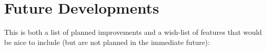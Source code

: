 \documentclass[12pt]{article}
\newcommand{\ie}{i.e.\ }
\newcommand{\hipass}{{\sc hipass}}
\begin{document}
%
%
%
%
%
%
%

\section{Future Developments}

This is both a list of planned improvements and a wish-list of
features that would be nice to include (but are not planned in the
immediate future):
\end{document}
